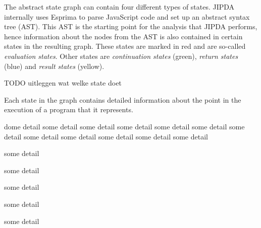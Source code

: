 The abstract state graph can contain four different types of states. JIPDA internally uses Esprima\cite{Esprima} to parse JavaScript code and set up an abstract syntax tree (AST). This AST is the starting point for the analysis that JIPDA performs, hence information about the nodes from the AST is also contained in certain states in the resulting graph. These states are marked in red and are so-called \textit{evaluation states}. Other states are \textit{continuation states} (green), \textit{return states} (blue) and \textit{result states} (yellow).

TODO uitleggen wat welke state doet

Each state in the graph contains detailed information about the point in the execution of a program that it represents.

\begin{description}[labelwidth=2cm,labelindent=11pt,leftmargin=2.6cm,align=left]
\item [Node] dome detail some detail some detail some detail some detail some detail some detail some detail some detail some detail some detail some detail %
\item [Kont] some detail
\item [Lkont]some detail
\item [Benv] some detail
\item [Store]some detail
\item [Value]some detail
\end{description}

